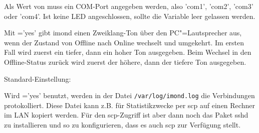 \begin{description}
{      Als Wert von  muss ein COM-Port angegeben werden, also
      'com1', 'com2', 'com3' oder 'com4'. Ist keine LED angeschlossen,
      sollte die Variable leer gelassen werden.}



    {Mit ='yes' gibt imond einen Zweiklang-Ton über den
      PC"=Lautsprecher aus, wenn der Zustand von Offline nach Online
      wechselt und umgekehrt. Im ersten Fall wird zuerst ein tiefer,
      dann ein hoher Ton ausgegeben. Beim Wechsel in den
      Offline-Status zurück wird zuerst der höhere, dann der tiefere
      Ton ausgegeben.}



    Standard-Einstellung: 
    
    {Wird ='yes' benutzt, werden in der
      Datei \verb+/var/log/imond.log+ die Verbindungen protokolliert. Diese Datei kann z.B.
      für Statistikzwecke per scp auf einen Rechner im LAN kopiert
      werden. Für den scp-Zugriff ist aber dann noch das Paket
      sshd zu installieren und so zu konfigurieren, dass es auch scp zur
      Verfügung stellt.

}
\end{description}
